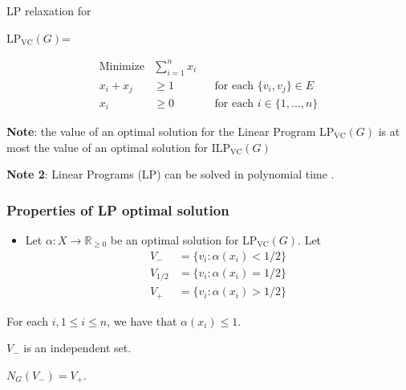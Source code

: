 \begin{frame}{LP relaxation for \VC}

 \begin{center}
  LP$_{\text{VC}}(G)$=
  \begin{boxedminipage}{0.79 \textwidth}
   \begin{align*}
     \text{Minimize} &\sum_{i=1}^n x_i\\
     x_i + x_j &\ge 1 && \text{for each } \{v_i,v_j\}\in E\\
     x_i &\ge 0 && \text{for each } i \in \{1,\dots,n\}
   \end{align*}
  \end{boxedminipage}
 \end{center}
 
 \noindent
 \textbf{Note}: the value of an optimal solution for the Linear Program LP$_{\text{VC}}(G)$ is at most the value of an optimal solution for ILP$_{\text{VC}}(G)$

 \medskip
 \noindent
\textbf{Note 2}: Linear Programs (LP) can be solved in polynomial time \cite{CohenLS19}.

\end{frame}


\begin{frame}
 \frametitle{Properties of LP optimal solution}

 \begin{itemize}
  \item Let $\alpha: X\rightarrow \mathbb{R}_{\ge 0}$ be an optimal solution for LP$_{\text{VC}}(G)$.
        Let
 \begin{align*}
  V_- &= \{v_i : \alpha(x_i) < 1/2\}\\
  V_{1/2} &= \{v_i : \alpha(x_i) = 1/2\}\\
  V_+ &= \{v_i : \alpha(x_i) > 1/2\}
 \end{align*}
 \end{itemize}

 \pause
 \begin{lemma}
  For each $i, 1\le i\le n$, we have that $\alpha(x_i)\le 1$.
 \end{lemma}
 
 \begin{lemma}
  $V_-$ is an independent set. %
 \end{lemma}

 \begin{lemma}
  $N_G(V_-)=V_+$. %
 \end{lemma}

\end{frame}


